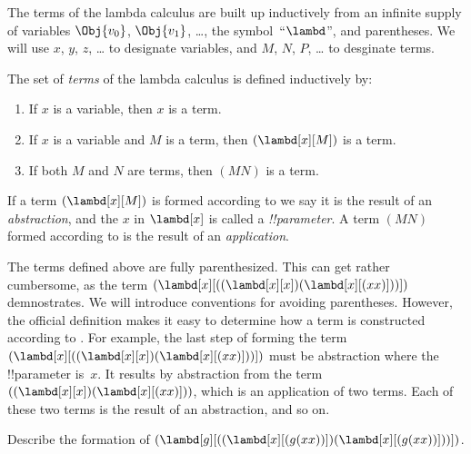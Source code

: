 \documentclass[../../../include/open-logic-section]{subfiles}
\begin{document}

The terms of the lambda calculus are built up inductively from an
infinite supply of variables $\Obj{v_0}$, $\Obj{v_1}$, \dots, the
symbol~``$\lambd$'', and parentheses. We will use $x$, $y$, $z$, \dots{}
to designate variables, and $M$, $N$, $P$, \dots{} to desginate terms.

\begin{defn}[Terms] 
The set of \emph{terms} of the lambda calculus is defined inductively by:
\begin{enumerate}
  \item {} If $x$ is a variable, then $x$ is a
    term.
  \item {} If $x$ is a variable and $M$ is a
    term, then $(\lambd[x][M])$ is a term.
  \item {} If both $M$ and $N$ are terms, then
    $(MN)$ is a term.
\end{enumerate}
\end{defn}

If a term $(\lambd[x][M])$ is formed according to
 we say it is the result of an
\emph{abstraction}, and the $x$ in $\lambd[x]$ is called a
\emph{!!{parameter}}.  A term $(MN)$ formed according to
 is the result of an \emph{application}.

The terms defined above are fully parenthesized. This can get rather
cumbersome, as the term
$(\lambd[x][((\lambd[x][x])(\lambd[x][(xx)]))])$ demnostrates. We will
introduce conventions for avoiding parentheses.  However, the official
definition makes it easy to determine how a term is constructed
according to . For example, the last step of forming
the term $(\lambd[x][((\lambd[x][x])(\lambd[x][(xx)]))])$ must be
abstraction where the !!{parameter} is~$x$. It results by abstraction
from the term $((\lambd[x][x])(\lambd[x][(xx)]))$, which is an
application of two terms. Each of these two terms is the result of an
abstraction, and so on.

\begin{prob}
Describe the formation of $(\lambd[g][((\lambd[x][(g (x x))])
  (\lambd[x][(g (x x))]))])$.
\end{prob}
\end{document}
